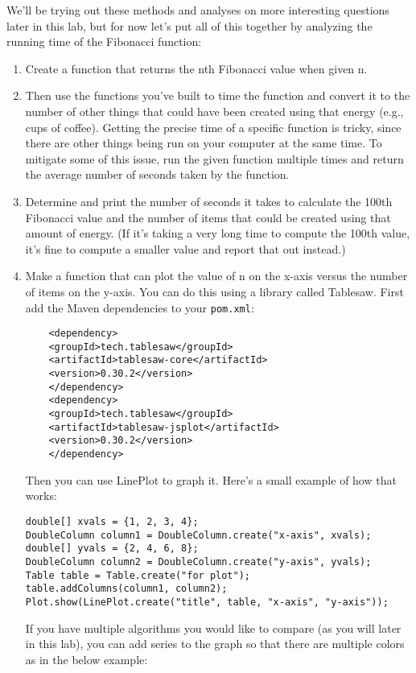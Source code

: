 \documentclass[12pt]{article}
\begin{document}
We'll be trying out these methods and analyses on more interesting questions later in this lab, but for now let's put all of this together by analyzing the running time of the Fibonacci function:
\begin{enumerate}
\item Create a function that returns the nth Fibonacci value when given n.
\item Then use the functions you've built to time the function and convert it to the number of other things that could have been created using that energy (e.g., cups of coffee).  Getting the precise time of a specific function is tricky, since there are other things being run on your computer at the same time. To mitigate some of this issue, run the given function multiple times and return the average number of seconds taken by the function. 
\item Determine and print the number of seconds it takes to calculate the 100th Fibonacci value and the number of items that could be created using that amount of energy.  (If it's taking a very long time to compute the 100th value, it's fine to compute a smaller value and report that out instead.)
\item Make a function that can plot the value of n on the x-axis versus the number of items on the y-axis.  You can do this using a library called Tablesaw.  First add the Maven dependencies to your \texttt{pom.xml}:
\begin{verbatim}
	<dependency>
    <groupId>tech.tablesaw</groupId>
    <artifactId>tablesaw-core</artifactId>
    <version>0.30.2</version>
	</dependency>
	<dependency>
    <groupId>tech.tablesaw</groupId>
    <artifactId>tablesaw-jsplot</artifactId>
    <version>0.30.2</version>
	</dependency>
\end{verbatim}
Then you can use LinePlot to graph it.  Here's a small example of how that works:
\begin{verbatim}
double[] xvals = {1, 2, 3, 4};
DoubleColumn column1 = DoubleColumn.create("x-axis", xvals);
double[] yvals = {2, 4, 6, 8};
DoubleColumn column2 = DoubleColumn.create("y-axis", yvals);
Table table = Table.create("for plot");
table.addColumns(column1, column2);
Plot.show(LinePlot.create("title", table, "x-axis", "y-axis"));
\end{verbatim}
If you have multiple algorithms you would like to compare (as you will later in this lab), you can add series to the graph so that there are multiple colors as in the below example:
\begin{verbatim}

\end{verbatim}
\end{enumerate}
\end{document}
